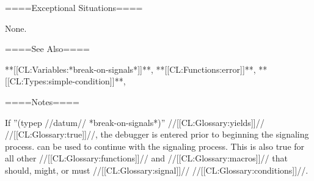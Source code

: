 ====Exceptional Situations====

None.

====See Also====

**[[CL:Variables:*break-on-signals*]]**, **[[CL:Functions:error]]**, **[[CL:Types:simple-condition]]**,{\secref\CondSignalHandle}

====Notes====

If ''(typep //datum// *break-on-signals*)'' //[[CL:Glossary:yields]]// //[[CL:Glossary:true]]//, the debugger is entered prior to beginning the signaling process.  can be used to continue with the signaling process. This is also true for all other //[[CL:Glossary:functions]]// and //[[CL:Glossary:macros]]// that should, might, or must //[[CL:Glossary:signal]]// //[[CL:Glossary:conditions]]//.


